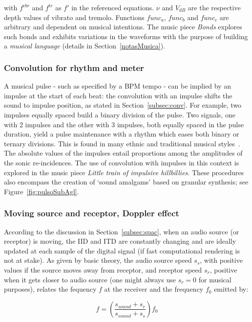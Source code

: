 \noindent with $f^{vbr}$ and $f^{tr}$ as $f'$ in the referenced equations.
 $\nu$ and $V_{dB}$ are the respective depth values of vibrato and
tremolo. Functions $func_a$, $func_b$ and $func_c$ are arbitrary and dependent on musical intentions.
The music piece \emph{Bonds} explores such bonds and exhibits variations in the waveforms with the purpose of building a \emph{musical
language} (details in Section~\ref{notasMusica}).~\cite{MASSA}

\subsubsection{Convolution for rhythm and meter}
A musical pulse - such as specified by a BPM
tempo - can be implied by an impulse at the start of each beat: the convolution with an impulse shifts the sound to impulse position, as stated in Section~\ref{subsec:conv}. For example, two impulses equally spaced build a binary division of the
pulse.
Two signals, one with 2 impulses and the other with 3 impulses, both equally spaced in the pulse duration, yield a pulse
maintenance with a rhythm which eases both binary or ternary
divisions.
This is found in many ethnic and traditional musical styles~\cite{Gramani}.
The absolute values of the impulses entail
proportions among the amplitudes of the sonic re-incidences.
The use of convolution with impulses in this context is explored in the music piece \emph{Little train of impulsive hillbillies}.
These procedures also encompass
the creation of `sound amalgams' based on granular synthesis; see Figure~\ref{fig:pulsoSubAgl}.~\cite{MASSA}


\subsubsection{Moving source and receptor, Doppler effect}
According to the discussion in Section~\ref{subsec:spac},
when an audio source (or receptor) is moving,
the IID and ITD are constantly changing and
are ideally updated at each sample of the digital signal 
(if fast computational rendering is not at stake).
As given by basic theory,
the audio source speed $s_s$, with positive values if the source moves away from receptor,
and receptor speed $s_r$, positive when it gets closer to audio source (one might always use $s_r=0$ for musical purposes),
relates the fequency $f$ at the receiver
and the frequency $f_0$ emitted by:

\begin{equation}\label{eq:fDoppler}
    f=\left(\frac{s_{sound}+s_r}{s_{sound}+s_s}\right)f_0
\end{equation}

